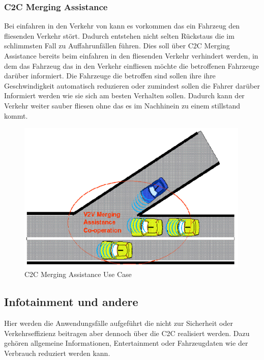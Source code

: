 \subsubsection{C2C Merging Assistance}
Bei einfahren in den Verkehr von kann es vorkommen das ein Fahrzeug den fliesenden Verkehr stört. Dadurch entstehen nicht selten Rückstaus die im schlimmsten Fall zu Auffahrunfällen führen. Dies soll über C2C Merging Assistance bereits beim einfahren in den fliesenden Verkehr verhindert werden, in dem das Fahrzeug das in den Verkehr einfliesen möchte die betroffenen Fahrzeuge darüber informiert. Die Fahrzeuge die betroffen sind sollen ihre ihre Geschwindigkeit automatisch reduzieren oder zumindest sollen die Fahrer darüber Informiert werden wie sie sich am besten Verhalten sollen. Dadurch kann der Verkehr weiter sauber fliesen ohne das es im Nachhinein zu einem stillstand kommt. 
\begin{figure}[htbp]
\includegraphics[width=0.99\textwidth]{content/images/06_use_cases/merging_assistance.png}
\caption{C2C Merging Assistance Use Case\cite{etsi102638}}
\label{fig:mergingassistance}
\end{figure}
\subsection{Infotainment und andere}
Hier werden die Anwendungsfälle aufgeführt die nicht zur Sicherheit oder Verkehrseffizienz beitragen aber dennoch über die \acl{C2C} realisiert werden. Dazu gehören allgemeine Informationen, Entertainment oder Fahrzeugdaten wie der Verbrauch reduziert werden kann. 
